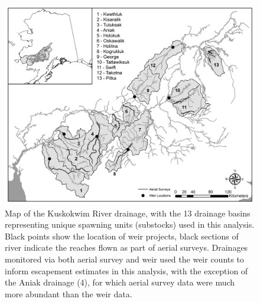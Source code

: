 \documentclass[12pt,]{book}
\theoremstyle{definition}
\theoremstyle{definition}
\theoremstyle{definition}
\theoremstyle{remark}
\begin{document}
\clearpage
\pagestyle{plain}

\begin{figure}
  \centering
  \includegraphics{img/Ch4/ch4-map.jpg}
  \caption{Map of the Kuskokwim River drainage, with the 13 drainage basins representing unique spawning units (substocks) used in this analysis. Black points show the location of weir projects, black sections of river indicate the reaches flown as part of aerial surveys. Drainages monitored via both aerial survey and weir used the weir counts to inform escapement estimates in this analysis, with the exception of the Aniak drainage (4), for which aerial survey data were much more abundant than the weir data.}
  \label{fig:ch4-map}
\end{figure}

\clearpage
\end{document}

